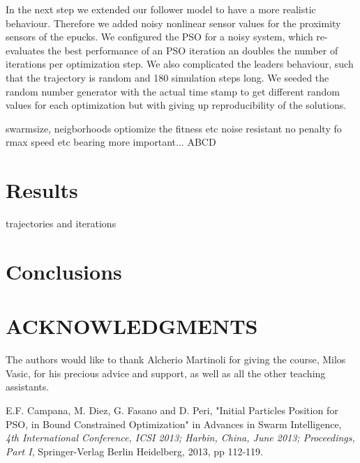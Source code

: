 \documentclass[a4, 10 pt, conference]{ieeeconf}  %
\begin{document}
In the next step we extended our follower model to have a more realistic behaviour. Therefore we added noisy nonlinear sensor values for the proximity sensors of the epucks. We configured the PSO for a noisy system, which re-evaluates the best performance of an PSO iteration an doubles the number of iterations per optimization step. We also complicated the leaders behaviour, such that the trajectory is random and 180 simulation steps long. We seeded the random number generator with the actual time stamp to get different random values for each optimization but with giving up reproducibility of the solutions.


swarmsize, neigborhoods
optiomize the fitness etc noise resistant
no penalty fo rmax speed etc
bearing more important... ABCD

\section{Results}
trajectories and iterations
\section{Conclusions}

\section{ACKNOWLEDGMENTS}
The authors would like to thank Alcherio Martinoli for giving the course, Milos Vasic, for his precious advice and support, as well as all the other teaching assistants.

\begin{thebibliography}{99}

E.F. Campana, M. Diez, G. Fasano and D. Peri, "Initial Particles Position for PSO,
in Bound Constrained Optimization" in Advances in Swarm Intelligence, {\it 4th International Conference, ICSI 2013; Harbin, China, June 2013; Proceedings, Part I}, Springer-Verlag Berlin Heidelberg, 2013, pp 112-119.

\end{thebibliography}
\end{document}
